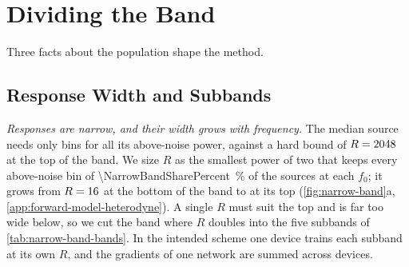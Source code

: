 \section{Dividing the Band}
\label{sec:narrow-band}

Three facts about the population shape the method.

\subsection{Response Width and Subbands}
\label{sec:narrow-band-span}

\emph{Responses are narrow, and their width grows with frequency.} The median source needs only
\ForwardModelSpanMedian{} bins for all its above-noise power, against a hard bound of
$R=2048$ at the top of the band. We size $R$ as the smallest power of two that keeps
every above-noise bin of \qty{\NarrowBandSharePercent}{\percent} of the sources at each $f_0$; it
grows from $R=16$ at the bottom of the band to \NarrowBandTopR{} at its top
(\cref{fig:narrow-band}a, \cref{app:forward-model-heterodyne}). A single $R$ must suit the top and is
far too wide below, so we cut the band where $R$ doubles into the five subbands of
\cref{tab:narrow-band-bands}. In the intended scheme one device trains each subband at its own $R$,
and the gradients of one network are summed across devices.

